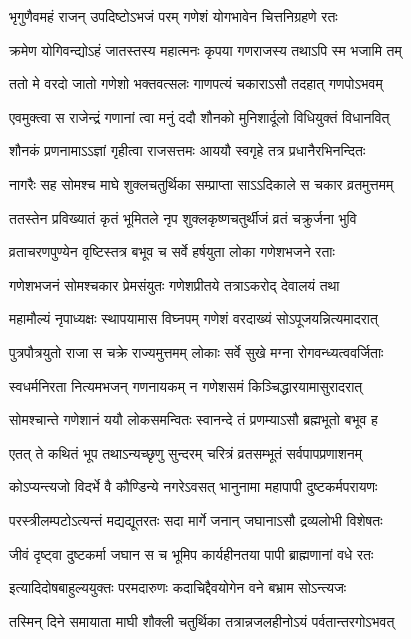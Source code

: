 \twolineshloka
{भृगुणैवमहं राजन् उपदिष्टोऽभजं परम्}
{गणेशं योगभावेन चित्तनिग्रहणे रतः} %

\twolineshloka
{क्रमेण योगिवन्द्योऽहं जातस्तस्य महात्मनः}
{कृपया गणराजस्य तथाऽपि स्म भजामि तम्} %

\twolineshloka
{ततो मे वरदो जातो गणेशो भक्तवत्सलः}
{गाणपत्यं चकाराऽसौ तदहात् गणपोऽभवम्} %

\twolineshloka
{एवमुक्त्वा स राजेन्द्रं गणानां त्वा मनुं ददौ}
{शौनको मुनिशार्दूलो विधियुक्तं विधानवित्} %

\twolineshloka
{शौनकं प्रणनामाऽऽज्ञां गृहीत्वा राजसत्तमः}
{आययौ स्वगृहे तत्र प्रधानैरभिनन्दितः} %

\twolineshloka
{नागरैः सह सोमश्च माघे शुक्लचतुर्थिका}
{सम्प्राप्ता साऽऽदिकाले स चकार व्रतमुत्तमम्} %

\twolineshloka
{ततस्तेन प्रविख्यातं कृतं भूमितले नृप}
{शुक्लकृष्णचतुर्थीजं व्रतं चक्रुर्जना भुवि} %

\twolineshloka
{व्रताचरणपुण्येन वृष्टिस्तत्र बभूव च}
{सर्वे हर्षयुता लोका गणेशभजने रताः} %

\twolineshloka
{गणेशभजनं सोमश्चकार प्रेमसंयुतः}
{गणेशप्रीतये तत्राऽकरोद् देवालयं तथा} %

\twolineshloka
{महामौल्यं नृपाध्यक्षः स्थापयामास विघ्नपम्}
{गणेशं वरदाख्यं सोऽपूजयन्नित्यमादरात्} %

\twolineshloka
{पुत्रपौत्रयुतो राजा स चक्रे राज्यमुत्तमम्}
{लोकाः सर्वे सुखे मग्ना रोगवन्ध्यत्ववर्जिताः} %

\twolineshloka
{स्वधर्मनिरता नित्यमभजन् गणनायकम्}
{न गणेशसमं किञ्चिद्धारयामासुरादरात्} %

\twolineshloka
{सोमश्चान्ते गणेशानं ययौ लोकसमन्वितः}
{स्वानन्दे तं प्रणम्याऽसौ ब्रह्मभूतो बभूव ह} %

\twolineshloka
{एतत् ते कथितं भूप तथाऽन्यच्छृणु सुन्दरम्}
{चरित्रं व्रतसम्भूतं सर्वपापप्रणाशनम्} %

\twolineshloka
{कोऽप्यन्त्यजो विदर्भे वै कौण्डिन्ये नगरेऽवसत्}
{भानुनामा महापापी दुष्टकर्मपरायणः} %

\twolineshloka
{परस्त्रीलम्पटोऽत्यन्तं मद्यद्यूतरतः सदा}
{मार्गे जनान् जघानाऽसौ द्रव्यलोभी विशेषतः} %

\twolineshloka
{जीवं दृष्ट्वा दुष्टकर्मा जघान स च भूमिप}
{कार्यहीनतया पापी ब्राह्मणानां वधे रतः} %

\twolineshloka
{इत्यादिदोषबाहुल्ययुक्तः परमदारुणः}
{कदाचिद्दैवयोगेन वने बभ्राम सोऽन्त्यजः} %

\twolineshloka
{तस्मिन् दिने समायाता माघी शौक्ली चतुर्थिका}
{तत्रान्नजलहीनोऽयं पर्वतान्तरगोऽभवत्} %

